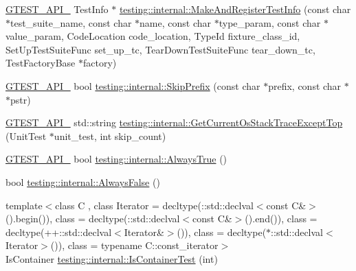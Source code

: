 \begin{DoxyCompactItemize}
\mbox{\hyperlink{_obj__test_2lib_2googletest-release-1_88_81_2googletest_2include_2gtest_2internal_2gtest-port_8h_aa73be6f0ba4a7456180a94904ce17790}{G\+T\+E\+S\+T\+\_\+\+A\+P\+I\+\_\+}} Test\+Info $\ast$ \mbox{\hyperlink{namespacetesting_1_1internal_a82087d14f1d2e6b1930237a644658d3a}{testing\+::internal\+::\+Make\+And\+Register\+Test\+Info}} (const char $\ast$test\+\_\+suite\+\_\+name, const char $\ast$name, const char $\ast$type\+\_\+param, const char $\ast$value\+\_\+param, Code\+Location code\+\_\+location, Type\+Id fixture\+\_\+class\+\_\+id, Set\+Up\+Test\+Suite\+Func set\+\_\+up\+\_\+tc, Tear\+Down\+Test\+Suite\+Func tear\+\_\+down\+\_\+tc, Test\+Factory\+Base $\ast$factory)
\item 
\mbox{\hyperlink{_obj__test_2lib_2googletest-release-1_88_81_2googletest_2include_2gtest_2internal_2gtest-port_8h_aa73be6f0ba4a7456180a94904ce17790}{G\+T\+E\+S\+T\+\_\+\+A\+P\+I\+\_\+}} bool \mbox{\hyperlink{namespacetesting_1_1internal_a244d9a3765727306b597b8992ab84036}{testing\+::internal\+::\+Skip\+Prefix}} (const char $\ast$prefix, const char $\ast$$\ast$pstr)
\item 
\mbox{\hyperlink{_obj__test_2lib_2googletest-release-1_88_81_2googletest_2include_2gtest_2internal_2gtest-port_8h_aa73be6f0ba4a7456180a94904ce17790}{G\+T\+E\+S\+T\+\_\+\+A\+P\+I\+\_\+}} std\+::string \mbox{\hyperlink{namespacetesting_1_1internal_aeb475922b8cd1e6c60ac052bbc396e62}{testing\+::internal\+::\+Get\+Current\+Os\+Stack\+Trace\+Except\+Top}} (Unit\+Test $\ast$unit\+\_\+test, int skip\+\_\+count)
\item 
\mbox{\hyperlink{_obj__test_2lib_2googletest-release-1_88_81_2googletest_2include_2gtest_2internal_2gtest-port_8h_aa73be6f0ba4a7456180a94904ce17790}{G\+T\+E\+S\+T\+\_\+\+A\+P\+I\+\_\+}} bool \mbox{\hyperlink{namespacetesting_1_1internal_a922c9da63cd4bf94fc473b9ecac76414}{testing\+::internal\+::\+Always\+True}} ()
\item 
bool \mbox{\hyperlink{namespacetesting_1_1internal_a4b24c851ab13569b1b15b3d259b60d2e}{testing\+::internal\+::\+Always\+False}} ()
\item 
{\footnotesize template$<$class C , class Iterator  = decltype(\+::std\+::declval$<$const C\&$>$().\+begin()), class  = decltype(\+::std\+::declval$<$const C\&$>$().\+end()), class  = decltype(++\+::std\+::declval$<$\+Iterator\&$>$()), class  = decltype($\ast$\+::std\+::declval$<$\+Iterator$>$()), class  = typename C\+::const\+\_\+iterator$>$ }\\Is\+Container \mbox{\hyperlink{namespacetesting_1_1internal_a764748b94f628bdd1dcd39dc81e8b71f}{testing\+::internal\+::\+Is\+Container\+Test}} (int)
$$
\end{DoxyCompactItemize}
